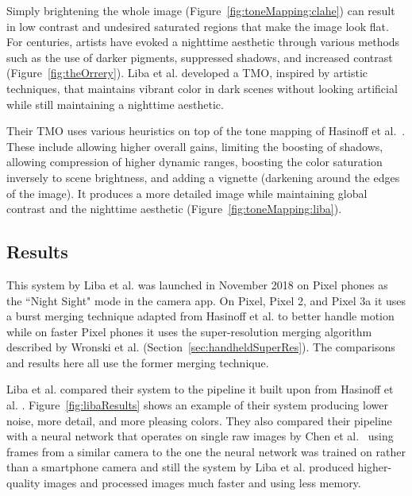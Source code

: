 \documentclass{sig-alternate}
\begin{document}
Simply brightening the whole image (Figure~\ref{fig:toneMapping:clahe}) can result in low contrast and undesired saturated regions that make the image look flat. For centuries, artists have evoked a nighttime aesthetic through various methods such as the use of darker pigments, suppressed shadows, and increased contrast (Figure~\ref{fig:theOrrery}).
Liba et al. developed a TMO, inspired by artistic techniques, that maintains vibrant color in dark scenes without looking artificial while still maintaining a nighttime aesthetic.

Their TMO uses various heuristics on top of the tone mapping of Hasinoff et al.~\cite{Hasinoff2016}. These include allowing higher overall gains, limiting the boosting of shadows, allowing compression of higher dynamic ranges, boosting the color saturation inversely to scene brightness, and adding a vignette (darkening around the edges of the image).
It produces a more detailed image while maintaining global contrast and the nighttime aesthetic (Figure~\ref{fig:toneMapping:liba}).





\subsection{Results}



This system by Liba et al. was launched in November 2018 on Pixel phones as the ``Night Sight" mode in the camera app. On Pixel, Pixel 2, and Pixel 3a it uses a burst merging technique adapted from Hasinoff et al. \cite{Hasinoff2016} to better handle motion while on faster Pixel phones it uses the super-resolution merging algorithm described by Wronski et al. \cite{Wronski2019} (Section~\ref{sec:handheldSuperRes}). The comparisons and results here all use the former merging technique.

\pagebreak

Liba et al. compared their system to the pipeline it built upon from Hasinoff et al. \cite{Hasinoff2016}. Figure~\ref{fig:libaResults} shows an example of their system producing lower noise, more detail, and more pleasing colors. They also compared their pipeline with a neural network that operates on single raw images by Chen et al.~\cite{Chen2018} using frames from a similar camera to the one the neural network was trained on rather than a smartphone camera and still the system by Liba et al. produced higher-quality images and processed images much faster and using less memory.
\end{document}
